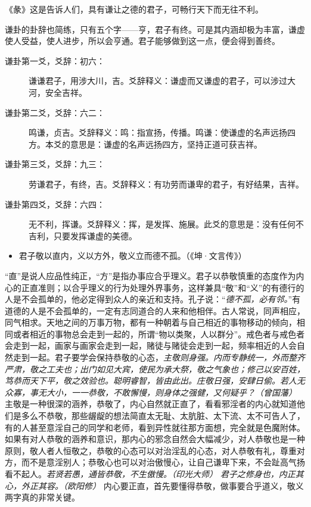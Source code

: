 《彖》这是告诉人们，具有谦让之德的君子，可畅行天下而无往不利。

谦卦的卦辞也简练，只有五个字——亨，君子有终。可是其内涵却极为丰富，谦虚使人受益，使人进步，所以会亨通。君子能够做到这一点，便会得到善终。

\begin{description}
    \item[谦卦第一爻，爻辞：初六：] 谦谦君子，用涉大川，吉。爻辞释义：谦虚而又谦虚的君子，可以涉过大河，安全吉祥。
    \item[谦卦第二爻，爻辞：六二：] 鸣谦，贞吉。爻辞释义：鸣：指宣扬，传播。鸣谦：使谦虚的名声远扬四方。本爻的意思是：谦虚的名声远扬四方，坚持正道可获吉祥。
    \item[谦卦第三爻，爻辞：九三：] 劳谦君子，有终，吉。爻辞释义：有功劳而谦卑的君子，有好结果，吉祥。
    \item[谦卦第四爻，爻辞：六四：] 无不利，挥谦。爻辞释义：挥，是发挥、施展。此爻的意思是：没有任何不吉利，只要发挥谦虚的美德。
\end{description}

\begin{itemize}\it
    \item 君子敬以直内，义以方外，敬义立而德不孤。（《坤·文言传》）
\end{itemize}

“直”是说人应品性纯正，“方”是指办事应合乎理义。君子以恭敬慎重的态度作为内心的正直准则；以合乎理义的行为处理外界事务，这样兼具“敬”和“义”的有德行的人是不会孤单的，他必定得到众人的亲近和支持。孔子说：“\textit{德不孤，必有邻。}”有道德的人是不会孤单的，一定有志同道合的人来和他相伴。古人常说，同声相应，同气相求。天地之间的万事万物，都有一种朝着与自己相近的事物移动的倾向，相同或者相近的事物总会走到一起的，所谓“物以类聚，人以群分”。戒色者与戒色者会走到一起，画家与画家会走到一起，赌徒与赌徒会走到一起，频率相近的人会自然走到一起。君子要学会保持恭敬的心态，\textit{主敬则身强。内而专静统一，外而整齐严肃，敬之工夫也；出门如见大宾，使民为承大祭，敬之气象也；修己以安百姓，笃恭而天下平，敬之效验也。聪明睿智，皆由此出。庄敬日强，安肆日偷。若人无众寡，事无大小，一一恭敬，不敢懈慢，则身体之强健，又何疑乎？（曾国藩）} 主敬是一种很深的涵养，恭敬了，内心自然就正直了，看看邪淫者的内心就知道他们是多么不恭敬，那些龌龊的想法简直太无耻、太肮脏、太下流、太不可告人了，有的人甚至意淫自己的同学和老师，看到异性就往那方面想，完全就是色魔附体。如果有对人恭敬的涵养和意识，那内心的邪念自然会大幅减少，对人恭敬也是一种原则，敬人者人恒敬之，恭敬的心态可以对治淫乱的心态，对人恭敬有礼，尊重对方，而不是意淫别人；恭敬心也可以对治傲慢心，让自己谦卑下来，不会趾高气扬看不起人。\textit{若贤若愚，通皆恭敬，不生傲慢。（印光大师）} \textit{君子之修身也，内正其心，外正其容。（欧阳修）} 内心要正直，首先要懂得恭敬，做事要合乎道义，敬义两字真的非常关键。

